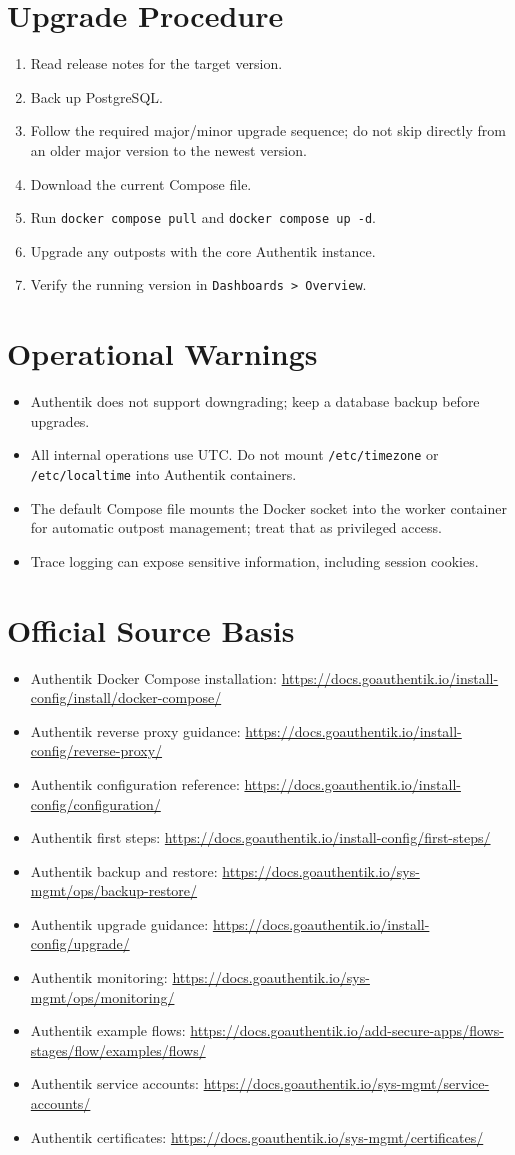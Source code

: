 \documentclass[11pt]{article}
\newcommand{\sourcebasis}{\section*{Official Source Basis}\begin{itemize}
\item Authentik Docker Compose installation: \url{https://docs.goauthentik.io/install-config/install/docker-compose/}
\item Authentik reverse proxy guidance: \url{https://docs.goauthentik.io/install-config/reverse-proxy/}
\item Authentik configuration reference: \url{https://docs.goauthentik.io/install-config/configuration/}
\item Authentik first steps: \url{https://docs.goauthentik.io/install-config/first-steps/}
\item Authentik backup and restore: \url{https://docs.goauthentik.io/sys-mgmt/ops/backup-restore/}
\item Authentik upgrade guidance: \url{https://docs.goauthentik.io/install-config/upgrade/}
\item Authentik monitoring: \url{https://docs.goauthentik.io/sys-mgmt/ops/monitoring/}
\item Authentik example flows: \url{https://docs.goauthentik.io/add-secure-apps/flows-stages/flow/examples/flows/}
\item Authentik service accounts: \url{https://docs.goauthentik.io/sys-mgmt/service-accounts/}
\item Authentik certificates: \url{https://docs.goauthentik.io/sys-mgmt/certificates/}
\end{itemize}}
\begin{document}
\section*{Upgrade Procedure}
\begin{enumerate}
\item Read release notes for the target version.
\item Back up PostgreSQL.
\item Follow the required major/minor upgrade sequence; do not skip directly from an older major version to the newest version.
\item Download the current Compose file.
\item Run \texttt{docker compose pull} and \texttt{docker compose up -d}.
\item Upgrade any outposts with the core Authentik instance.
\item Verify the running version in \texttt{Dashboards > Overview}.
\end{enumerate}

\section*{Operational Warnings}
\begin{itemize}
\item Authentik does not support downgrading; keep a database backup before upgrades.
\item All internal operations use UTC. Do not mount \texttt{/etc/timezone} or \texttt{/etc/localtime} into Authentik containers.
\item The default Compose file mounts the Docker socket into the worker container for automatic outpost management; treat that as privileged access.
\item Trace logging can expose sensitive information, including session cookies.
\end{itemize}

\sourcebasis
\end{document}
